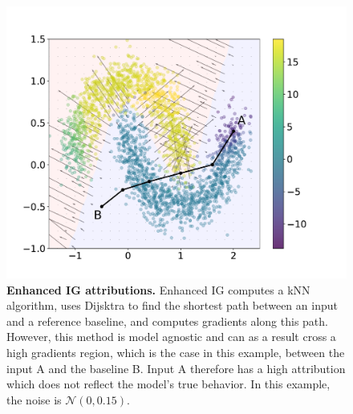 \begin{figure}[ht]
\vskip -0.2in
\begin{center}
\centerline{\includegraphics[width=\columnwidth]{figures/enhanced_ig_y.pdf}}
\caption{\textbf{Enhanced IG attributions.} Enhanced IG computes a kNN algorithm, uses Dijsktra to find the shortest path between an input and a reference baseline, and computes gradients along this path. However, this method is model agnostic and can as a result cross a high gradients region, which is the case in this example, between the input A and the baseline B. Input A therefore has a high attribution which does not reflect the model's true behavior. In this example, the noise is $\mathcal{N}(0, 0.15)$.}
\label{fig:enhanced_ig}
\end{center}
\vskip -0.2in
\end{figure}

